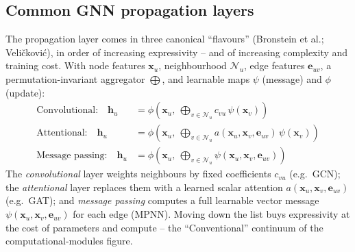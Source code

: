 
\subsection{Common GNN propagation layers}
The propagation layer comes in three canonical ``flavours'' (Bronstein et al.;
Veli\v{c}kovi\'c), in order of increasing expressivity -- and of increasing
complexity and training cost. With node features $\mathbf{x}_u$, neighbourhood
$\mathcal{N}_u$, edge features $\mathbf{e}_{uv}$, a permutation-invariant
aggregator $\bigoplus$, and learnable maps $\psi$ (message) and $\phi$
(update):
%
\begin{align}
\text{Convolutional:}\quad
  \mathbf{h}_u &= \phi\!\left(\mathbf{x}_u,\ \bigoplus_{v\in\mathcal{N}_u}
       c_{vu}\,\psi\!\left(\mathbf{x}_v\right)\right) \\[2pt]
\text{Attentional:}\quad
  \mathbf{h}_u &= \phi\!\left(\mathbf{x}_u,\ \bigoplus_{v\in\mathcal{N}_u}
       a(\mathbf{x}_u,\mathbf{x}_v,\mathbf{e}_{uv})\,
       \psi\!\left(\mathbf{x}_v\right)\right) \\[2pt]
\text{Message passing:}\quad
  \mathbf{h}_u &= \phi\!\left(\mathbf{x}_u,\ \bigoplus_{v\in\mathcal{N}_u}
       \psi\!\left(\mathbf{x}_u,\mathbf{x}_v,\mathbf{e}_{uv}\right)\right)
\end{align}
%
The \emph{convolutional} layer weights neighbours by fixed coefficients
$c_{vu}$ (e.g.\ GCN); the \emph{attentional} layer replaces them with a learned
scalar attention $a(\mathbf{x}_u,\mathbf{x}_v,\mathbf{e}_{uv})$ (e.g.\ GAT); and
\emph{message passing} computes a full learnable vector message
$\psi(\mathbf{x}_u,\mathbf{x}_v,\mathbf{e}_{uv})$ for each edge (MPNN). Moving
down the list buys expressivity at the cost of parameters and compute -- the
``Conventional'' continuum of the computational-modules figure.


